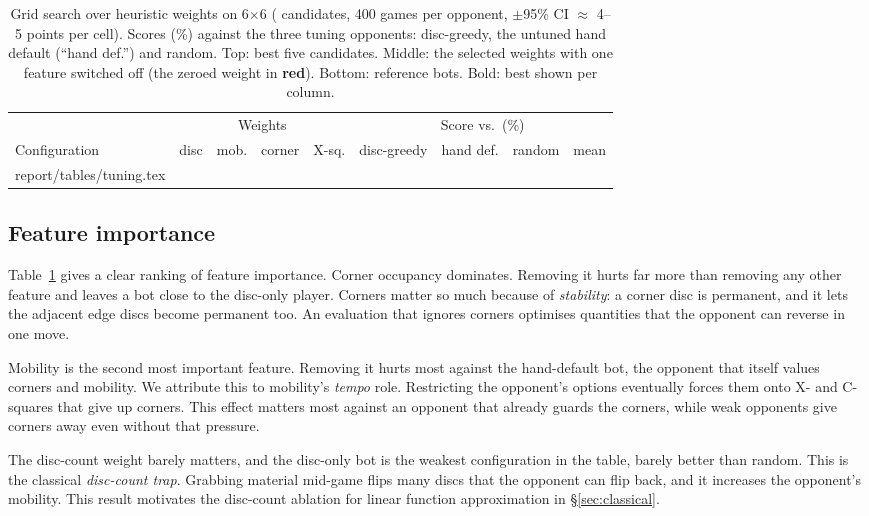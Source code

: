 \documentclass[11pt]{article}
\makeatletter
\newcommand{\bx}[1]{#1$\times$#1}
\newcommand{\tabinput}[1]{\@@input #1 }
\makeatother
\begin{document}
\begin{table}[H]
\centering
\caption{Grid search over heuristic weights on \bx{6} (\NumCandidates{}
candidates, 400 games per opponent, $\pm$95\% CI $\approx$ 4--5 points per
cell). Scores (\%) against the three tuning opponents: disc-greedy, the untuned
hand default (``hand def.'') and random. Top: best five candidates. Middle:
the selected weights with one feature switched off (the zeroed weight in
\textcolor{red!75!black}{\textbf{red}}). Bottom: reference bots. Bold: best
shown per column.}
\label{tab:tuning}
\begin{tabular}{@{}lrrrrrrrr@{}}
\toprule
& \multicolumn{4}{c}{Weights} & \multicolumn{4}{c}{Score vs.\ (\%)} \\
\cmidrule(lr){2-5}\cmidrule(l){6-9}
Configuration & disc & mob. & corner & X-sq. & disc-greedy & hand def. & random & mean \\
\midrule
\tabinput{report/tables/tuning.tex}
\bottomrule
\end{tabular}
\end{table}

\subsection{Feature importance}

Table~\ref{tab:tuning} gives a clear ranking of feature importance. Corner
occupancy dominates. Removing it hurts far more than removing any other feature
and leaves a bot close to the disc-only player. Corners matter so much because
of \emph{stability}: a corner disc is permanent, and it lets the adjacent edge
discs become permanent too. An evaluation that ignores corners optimises
quantities that the opponent can reverse in one move.

Mobility is the second most important feature. Removing it hurts most against
the hand-default bot, the opponent that itself values corners and mobility.
We attribute this to mobility's \emph{tempo} role. Restricting the opponent's
options eventually forces them onto X- and C-squares that give up corners. This
effect matters most against an opponent that already guards the corners, while
weak opponents give corners away even without that pressure.

The disc-count weight barely matters, and the disc-only bot is the weakest
configuration in the table, barely better than random. This is the classical
\emph{disc-count trap}. Grabbing material mid-game flips many discs that the
opponent can flip back, and it increases the opponent's mobility. This result
motivates the disc-count ablation for linear function approximation in
\S\ref{sec:classical}.
\end{document}
